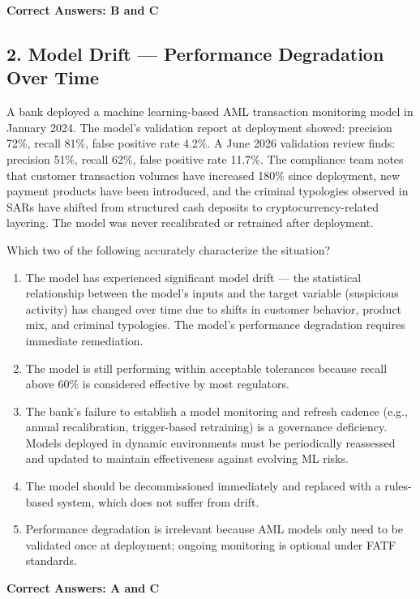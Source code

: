 \documentclass[11pt,a4paper]{article}
\begin{document}
	\textbf{Correct Answers: B and C}
	
	\subsection{2. Model Drift — Performance Degradation Over Time}
	
	A bank deployed a machine learning-based AML transaction monitoring model in January 2024. The model's validation report at deployment showed: precision 72\%, recall 81\%, false positive rate 4.2\%. A June 2026 validation review finds: precision 51\%, recall 62\%, false positive rate 11.7\%. The compliance team notes that customer transaction volumes have increased 180\% since deployment, new payment products have been introduced, and the criminal typologies observed in SARs have shifted from structured cash deposits to cryptocurrency-related layering. The model was never recalibrated or retrained after deployment.
	
	Which two of the following accurately characterize the situation?
	
	\begin{enumerate}[label=\Alph*.]
		\item The model has experienced significant model drift — the statistical relationship between the model's inputs and the target variable (suspicious activity) has changed over time due to shifts in customer behavior, product mix, and criminal typologies. The model's performance degradation requires immediate remediation.
		\item The model is still performing within acceptable tolerances because recall above 60\% is considered effective by most regulators.
		\item The bank's failure to establish a model monitoring and refresh cadence (e.g., annual recalibration, trigger-based retraining) is a governance deficiency. Models deployed in dynamic environments must be periodically reassessed and updated to maintain effectiveness against evolving ML risks.
		\item The model should be decommissioned immediately and replaced with a rules-based system, which does not suffer from drift.
		\item Performance degradation is irrelevant because AML models only need to be validated once at deployment; ongoing monitoring is optional under FATF standards.
	\end{enumerate}
	
	\textbf{Correct Answers: A and C}
	
\end{document}
